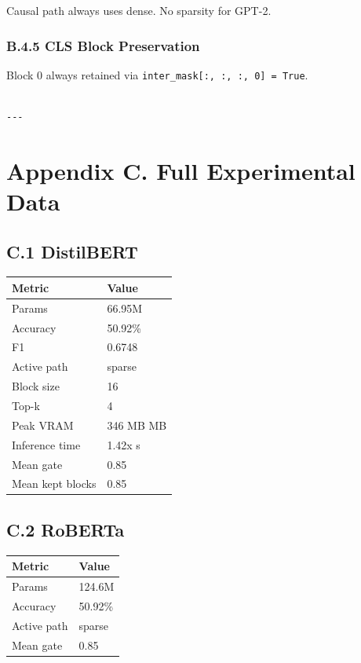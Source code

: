 Causal path always uses dense. No sparsity for GPT-2.

\subsubsection{B.4.5 CLS Block Preservation}

Block 0 always retained via \texttt{inter\_mask[:, :, :, 0] = True}.
\begin{lstlisting}

---
\end{lstlisting}

\section{Appendix C. Full Experimental Data}

\subsection{C.1 DistilBERT}

\begin{table}[H]
\centering
\small
\begin{tabular}{ll}
\toprule
\textbf{Metric} & \textbf{Value} \\
\midrule
Params & 66.95M \\
Accuracy & 50.92\% \\
F1 & 0.6748 \\
Active path & sparse \\
Block size & 16 \\
Top-k & 4 \\
Peak VRAM & 346 MB MB \\
Inference time & 1.42x s \\
Mean gate & 0.85 \\
Mean kept blocks & 0.85 \\
\bottomrule
\end{tabular}
\end{table}

\subsection{C.2 RoBERTa}

\begin{table}[H]
\centering
\small
\begin{tabular}{ll}
\toprule
\textbf{Metric} & \textbf{Value} \\
\midrule
Params & 124.6M \\
Accuracy & 50.92\% \\
Active path & sparse \\
Mean gate & 0.85 \\
\bottomrule
\end{tabular}
\end{table}

